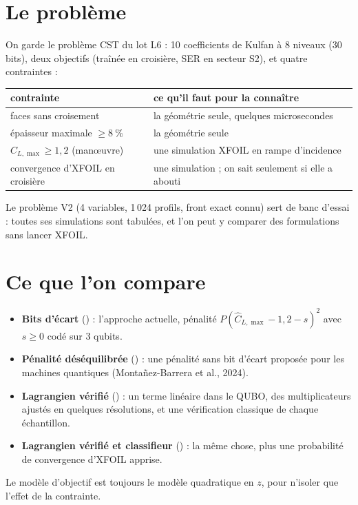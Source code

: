 \section{Le problème}
On garde le problème CST du lot L6 : 10 coefficients de Kulfan à 8 niveaux (30 bits), deux objectifs (traînée en croisière, SER en secteur S2), et quatre contraintes :
\begin{center}
\renewcommand{\arraystretch}{1.2}
\begin{tabularx}{\linewidth}{>{\raggedright\arraybackslash}p{4.4cm} >{\raggedright\arraybackslash}X}
\toprule
contrainte & ce qu'il faut pour la connaître \\
\midrule
faces sans croisement & la géométrie seule, quelques microsecondes \\
épaisseur maximale $\ge8~\%$ & la géométrie seule \\
$C_{L,\max}\ge1{,}2$ (manœuvre) & une simulation XFOIL en rampe d'incidence \\
convergence d'XFOIL en croisière & une simulation ; on sait seulement si elle a abouti \\
\bottomrule
\end{tabularx}
\end{center}
Le problème V2 (4 variables, 1\,024 profils, front exact connu) sert de banc d'essai : toutes ses simulations sont tabulées, et l'on peut y comparer des formulations sans lancer XFOIL.

\section{Ce que l'on compare}
\begin{itemize}
\item \textbf{Bits d'écart} () : l'approche actuelle, pénalité $P(\hat C_{L,\max}-1{,}2-s)^2$ avec $s\ge0$ codé sur 3 qubits.
\item \textbf{Pénalité déséquilibrée} () : une pénalité sans bit d'écart proposée pour les machines quantiques (Montañez-Barrera et al., 2024).
\item \textbf{Lagrangien vérifié} () : un terme linéaire dans le QUBO, des multiplicateurs ajustés en quelques résolutions, et une vérification classique de chaque échantillon.
\item \textbf{Lagrangien vérifié et classifieur} () : la même chose, plus une probabilité de convergence d'XFOIL apprise.
\end{itemize}
Le modèle d'objectif est toujours le modèle quadratique en $z$, pour n'isoler que l'effet de la contrainte.

